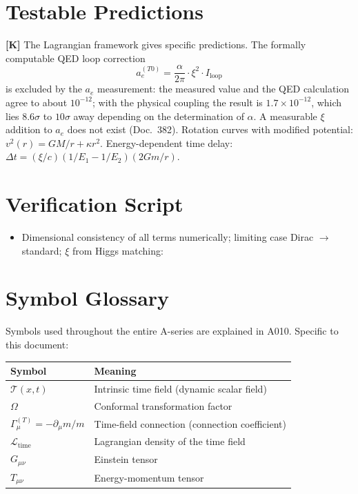 \section{Testable Predictions}

\textbf{[K]} The Lagrangian framework gives specific predictions. The formally computable QED loop correction
\[
  a_e^{(T0)} = \frac\alpha{2\pi}\cdot\xi^2\cdot I_\text{loop}
\]
is excluded by the $a_e$ measurement: the measured value and the QED calculation agree to about $10^{-12}$; with the physical coupling the result is $1{.}7\times10^{-12}$, which lies $8{.}6\sigma$ to $10\sigma$ away depending on the determination of $\alpha$. A measurable $\xi$ addition to $a_e$ does not exist (Doc.~382). Rotation curves with
modified potential: $v^2(r)=GM/r+\kappa r^2$. Energy-dependent time delay:
$\Delta t=(\xi/c)(1/E_1-1/E_2)(2Gm/r)$.

\section{Verification Script}

\begin{itemize}[leftmargin=2em,itemsep=2pt,topsep=2pt]
  \item Dimensional consistency of all terms numerically; limiting case Dirac
    $\to$ standard; $\xi$ from Higgs matching:
\end{itemize}

\section{Symbol Glossary}

Symbols used throughout the entire A-series are explained in A010.
Specific to this document:

\begin{center}
\renewcommand{\arraystretch}{1.3}
{\small\begin{tabular}{lp{9cm}}
\toprule
Symbol & Meaning \\
\midrule
$\mathcal{T}(x,t)$ & Intrinsic time field (dynamic scalar field) \\
$\Omega$ & Conformal transformation factor \\
$\Gamma_\mu^{(T)}=-\partial_\mu m/m$ & Time-field connection (connection coefficient) \\
$\mathcal{L}_\text{time}$ & Lagrangian density of the time field \\
$G_{\mu\nu}$ & Einstein tensor \\
$T_{\mu\nu}$ & Energy-momentum tensor \\
\bottomrule
\end{tabular}}
\renewcommand{\arraystretch}{1.0}
\end{center}

